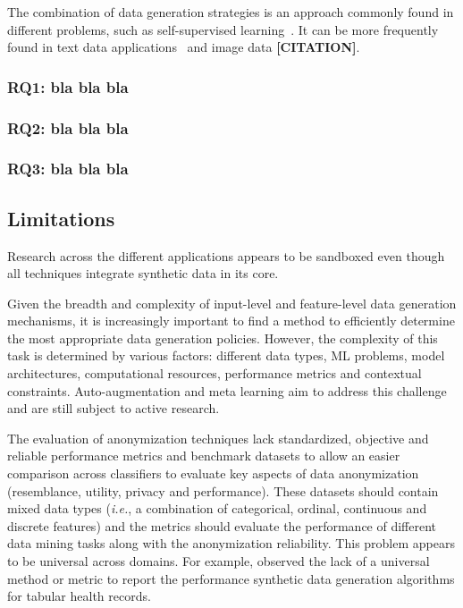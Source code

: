 \documentclass[parskip=full]{scrartcl}
\begin{document}
The combination of data generation strategies is an approach commonly found in
different problems, such as self-supervised
learning~\cite{grill2020bootstrap}. It can be more frequently found in text
data applications~\cite{bayer2021survey} and image data \textbf{[CITATION]}.

\subsubsection{RQ1: bla bla bla}

\subsubsection{RQ2: bla bla bla}

\subsubsection{RQ3: bla bla bla}

\subsection{Limitations}

Research across the different applications appears to be sandboxed even though
all techniques integrate synthetic data in its core.

Given the breadth and complexity of input-level and feature-level data
generation mechanisms, it is increasingly important to find a method to
efficiently determine the most appropriate data generation policies. However,
the complexity of this task is determined by various factors: different data
types, ML problems, model architectures, computational resources, performance
metrics and contextual constraints. Auto-augmentation and meta learning aim to
address this challenge and are still subject to active research.

The evaluation of anonymization techniques lack standardized, objective and
reliable performance metrics and benchmark datasets to allow an easier
comparison across classifiers to evaluate key aspects of data anonymization
(resemblance, utility, privacy and performance). These datasets should contain
mixed data types (\textit{i.e.}, a combination of categorical, ordinal,
continuous and discrete features) and the metrics should evaluate the
performance of different data mining tasks along with the anonymization
reliability. This problem appears to be universal across domains. For example,
\citet{hernandez2022synthetic} observed the lack of a universal method or metric
to report the performance synthetic data generation algorithms for tabular
health records.
\end{document}
